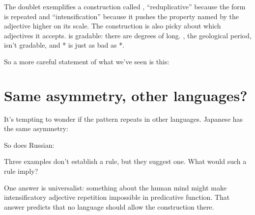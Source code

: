 The doublet  exemplifies a construction called , \enquote{reduplicative} because the form is repeated and \enquote{intensification} because it pushes the property named by the adjective higher on its scale. The construction is also picky about which adjectives it accepts.  is gradable: there are degrees of long. , the geological period, isn't gradable, and * is just as bad as *.

So a more careful statement of what we've seen is this:

\label{def:reduplication-rule}
\z

\section{Same asymmetry, other languages?}

It's tempting to wonder if the pattern repeats in other languages. Japanese has the same asymmetry:

\ea
   \z
\z

So does Russian:

\ea
    \z
\z

\noindent Three examples don't establish a rule, but they suggest one. What would such a rule imply?

One answer is universalist: something about the human mind might make intensificatory adjective repetition impossible in predicative function. That answer predicts that no language should allow the construction there.

